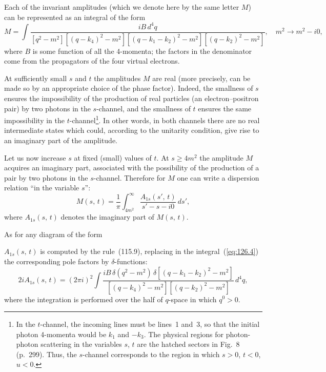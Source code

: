 Each of the invariant amplitudes (which we denote here by the same letter $M$) can be represented as an integral of the form
\begin{equation}
M = \int \frac{iB\,d^4q}{[q^2 - m^2][(q-k_4)^2 - m^2][(q-k_1-k_2)^2 - m^2][(q-k_2)^2 - m^2]},\quad m^2 \to m^2 - i0,
\label{eq:126.4}
\end{equation}
where $B$ is some function of all the 4-momenta; the factors in the denominator come from the propagators of the four virtual electrons.

At sufficiently small $s$ and $t$ the amplitudes $M$ are real (more precisely, can be made so by an appropriate choice of the phase factor). Indeed, the smallness of $s$ ensures the impossibility of the production of real particles (an electron--positron pair) by two photons in the $s$-channel, and the smallness of $t$ ensures the same impossibility in the $t$-channel\footnote{In the $t$-channel, the incoming lines must be lines~1 and~3, so that the initial photon 4-momenta would be $k_1$ and $-k_3$. The physical regions for photon-photon scattering in the variables $s$, $t$ are the hatched sectors in Fig.~8 (p.~299). Thus, the $s$-channel corresponds to the region in which $s > 0$, $t < 0$, $u < 0$.}. In other words, in both channels there are no real intermediate states which could, according to the unitarity condition, give rise to an imaginary part of the amplitude.


Let us now increase $s$ at fixed (small) values of $t$. At $s \geqslant 4m^2$ the amplitude $M$ acquires an imaginary part, associated with the possibility of the production of a pair by two photons in the $s$-channel. Therefore for $M$ one can write a dispersion relation ``in the variable $s$'':
\begin{equation}
M(s,\,t) = \frac{1}{\pi}\int_{4m^2}^{\infty} \frac{A_{1s}(s',\,t)}{s' - s - i0}\,ds',
\label{eq:126.5}
\end{equation}
where $A_{1s}(s,\,t)$ denotes the imaginary part of $M(s,\,t)$.

As for any diagram of the form


$A_{1s}(s,\,t)$ is computed by the rule~(115.9), replacing in the integral~(\ref{eq:126.4}) the corresponding pole factors by $\delta$-functions:
\begin{equation}
2iA_{1s}(s,\,t) = (2\pi i)^2\int \frac{iB\,\delta(q^2 - m^2)\,\delta[(q-k_1-k_2)^2 - m^2]}{[(q-k_4)^2 - m^2][(q-k_2)^2 - m^2]}\,d^4q,
\label{eq:126.6}
\end{equation}
where the integration is performed over the half of $q$-space in which $q^0 > 0$.


